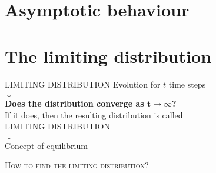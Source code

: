 \section{Asymptotic behaviour}
%     
%     

\section{\small{The limiting distribution}}
  \begin{frame}{LIMITING DISTRIBUTION}
    \centering
    Evolution for $t$ time steps\\\medskip
    $\downarrow$\\\medskip
    \large \textbf{Does the distribution converge as $\mathbf{t \rightarrow \infty}$?}\\\medskip \small If it does, then the resulting distribution is called \medskip
    \\\medskip
    \Large
    \MakeUppercase{\alert{Limiting distribution}}\\\medskip
    $\downarrow$\\\medskip
    \normalsize
    Concept of \alert{equilibrium}
  \end{frame}

  \begin{frame}
    \centering\Large
    \textsc{How to find the limiting distribution?}
  \end{frame}

